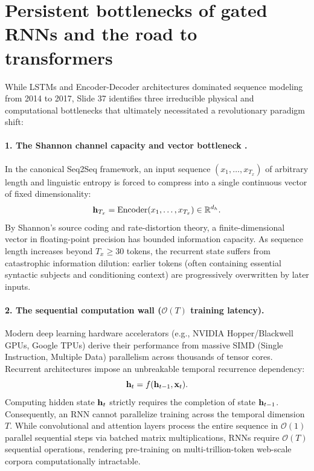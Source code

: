 \documentclass[../../main.tex]{subfiles}
\begin{document}
\section{Persistent bottlenecks of gated RNNs and the road to transformers}
\label{sec:rnn_bottlenecks}

While LSTMs and Encoder-Decoder architectures dominated sequence modeling from 2014 to 2017, Slide 37 identifies three irreducible physical and computational bottlenecks that ultimately necessitated a revolutionary paradigm shift:

\paragraph{1. The Shannon channel capacity and vector bottleneck \cite{sutskever2014}.}
In the canonical Seq2Seq framework, an input sequence $(x_1, \dots, x_{T_x})$ of arbitrary length and linguistic entropy is forced to compress into a single continuous vector of fixed dimensionality:
\begin{equation}
\mathbf{h}_{T_x} = \operatorname{Encoder}(x_1, \dots, x_{T_x}) \in \mathbb{R}^{d_h}.
\end{equation}
By Shannon's source coding and rate-distortion theory, a finite-dimensional vector in floating-point precision has bounded information capacity. As sequence length increases beyond $T_x \ge 30$ tokens, the recurrent state suffers from catastrophic information dilution: earlier tokens (often containing essential syntactic subjects and conditioning context) are progressively overwritten by later inputs.

\paragraph{2. The sequential computation wall ($\mathcal{O}(T)$ training latency).}
Modern deep learning hardware accelerators (e.g., NVIDIA Hopper/Blackwell GPUs, Google TPUs) derive their performance from massive SIMD (Single Instruction, Multiple Data) parallelism across thousands of tensor cores. Recurrent architectures impose an unbreakable temporal recurrence dependency:
\begin{equation}
\mathbf{h}_t = f(\mathbf{h}_{t-1}, \mathbf{x}_t).
\end{equation}
Computing hidden state $\mathbf{h}_t$ strictly requires the completion of state $\mathbf{h}_{t-1}$. Consequently, an RNN cannot parallelize training across the temporal dimension $T$. While convolutional and attention layers process the entire sequence in $\mathcal{O}(1)$ parallel sequential steps via batched matrix multiplications, RNNs require $\mathcal{O}(T)$ sequential operations, rendering pre-training on multi-trillion-token web-scale corpora computationally intractable.
\end{document}
